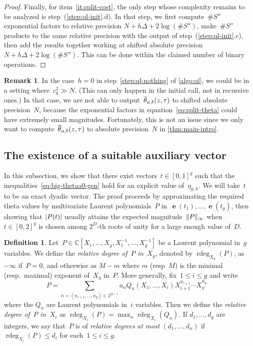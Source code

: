 \documentclass[12pt,oneside]{amsart}
\numberwithin{equation}{section}
\theoremstyle{definition}
\newtheorem{defn}[equation]{Definition}
\newtheorem{rem}[equation]{Remark}
\newcommand{\Z}{\mathbb{Z}}
\newcommand{\C}{\mathbb{C}}
\DeclareMathOperator{\thetatilde}{\rlap{\raisebox{-0.1ex}{$\widetilde{\phantom{\,t}}$}}\theta}
\DeclareMathOperator{\rdeg}{rdeg}
\DeclareMathOperator{\e}{\mathbf{e}}
\DeclarePairedDelimiter{\abs}{|}{|}
\DeclarePairedDelimiter{\norm}{\|}{\|}
\begin{document}
\begin{proof}
  Finally, for item~\eqref{it:split-cost}, the only step whose complexity
  remains to be analyzed is step~(\ref{step:ql-init}.d). In that step, we first
  compute~$\#S''$ exponential factors to relative precision
  $N + h\Delta + 2\log(\#S'')$, make~$\#S''$ products to the same relative
  precision with the output of step~(\ref{step:ql-init}.c), then add the
  results together working at shifted absolute
  precision $N + h\Delta + 2\log(\#S'')$. This can be done within the claimed
  number of binary operations.
\end{proof}

\begin{rem}
  In the case~$h=0$ in step~\eqref{step:ql-nothing} of \cref{algo:ql}, we could
  be in a setting where~$c_g^2 \gg N$. (This can only happen in the initial
  call, not in recursive ones.) In that case, we are not able to
  output~$\smash{\thetatilde}_{a,b}(z,\tau)$ to shifted absolute precision~$N$,
  because the exponential factors in equation~\eqref{eq:split-theta} could have
  extremely small magnitudes. Fortunately, this is not an issue since we only
  want to compute~$\thetatilde_{a,b}(z,\tau)$ to absolute precision~$N$ in
  \cref{thm:main-intro}.
\end{rem}

\subsection{The existence of a suitable auxiliary vector}
\label{subsec:t-exists}

In this subsection, we show that there exist vectors~$t \in [0,1]^g$ such that
the inequalities~\eqref{eq:big-thetaa0-gen} hold for an explicit value
of~$\eta_{g,h}$. We will take~$t$ to be an exact dyadic vector. The proof
proceeds by approximating the required theta values by multivariate Laurent
polynomials~$P$ in~$\e(t_1),\ldots,\e(t_g)$, then showing that $\abs{P(t)}$
usually attains the expected magnitude~$\norm{P}_\infty$ when~$t\in [0,2]^g$ is
chosen among $2^D$-th roots of unity for a large enough value of~$D$.

\begin{defn}
  \label{def:rel-degrees}
  Let~$P\in \C[X_1,\ldots, X_g, X_1^{-1},\ldots, X_g^{-1}]$ be a Laurent
  polynomial in~$g$ variables. We define the \emph{relative degree of~$P$
    in~$X_g$}, denoted by $\rdeg_{X_g}(P)$, as $-\infty$ if~$P=0$, and
  otherwise as $M-m$ where $m$ (resp~$M$) is the minimal (resp.~maximal)
  exponent of~$X_g$ in~$P$. More generally, fix~$1\leq i\leq g$ and write
  \begin{equation}
    \label{eq:successive-decomposition}
    P = \sum_{n= (n_{i+1},\ldots,n_g)\in \Z^{g-i}} a_n Q_n(X_1,\ldots,X_i) X_{i+1}^{n_{i+1}}\cdots X_g^{n_g}
  \end{equation}
  where the $Q_n$ are Laurent polynomials in~$i$ variables.  Then we define the
  \emph{relative degree of~$P$ in~$X_i$} as
  $\rdeg_{X_i}(P) = \max_n \rdeg_{X_i}(Q_n)$. If $d_1,\ldots, d_g$ are
  integers, we say that~$P$ is of \emph{relative degrees at most}
  $(d_1,\ldots,d_n)$ if $\rdeg_{X_i}(P)\leq d_i$ for each~$1\leq i\leq g$.
\end{defn}
\end{document}
